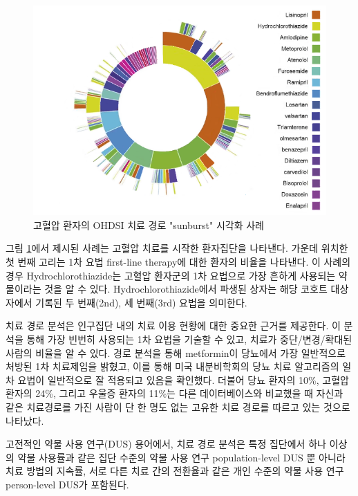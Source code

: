 \documentclass[10.5pt]{book}
\theoremstyle{definition}
\theoremstyle{definition}
\theoremstyle{definition}
\theoremstyle{remark}
\begin{document}
\begin{figure}

{\centering \includegraphics[width=1\linewidth]{images/Characterization/pnasTreatmentPathwaysSunburst} 

}

\caption{고혈압 환자의 OHDSI 치료 경로 "sunburst" 시각화 사례}\label{fig:treatmentPathwaysSunburstDataViz}
\end{figure}

그림 \ref{fig:treatmentPathwaysSunburstDataViz}에서 제시된 사례는 고혈압
치료를 시작한 환자집단을 나타낸다. 가운데 위치한 첫 번째 고리는 1차 요법
first-line therapy에 대한 환자의 비율을 나타낸다. 이 사례의 경우
Hydrochlorothiazide는 고혈압 환자군의 1차 요법으로 가장 흔하게 사용되는
약물이라는 것을 알 수 있다. Hydrochlorothiazide에서 파생된 상자는 해당
코호트 대상자에서 기록된 두 번째(2nd), 세 번째(3rd) 요법을 의미한다.

치료 경로 분석은 인구집단 내의 치료 이용 현황에 대한 중요한 근거를
제공한다. 이 분석을 통해 가장 빈번히 사용되는 1차 요법을 기술할 수 있고,
치료가 중단/변경/확대된 사람의 비율을 알 수 있다. 경로 분석을 통해
metformin이 당뇨에서 가장 일반적으로 처방된 1차 치료제임을 밝혔고, 이를
통해 미국 내분비학회의 당뇨 치료 알고리즘의 일차 요법이 일반적으로 잘
적용되고 있음을 확인했다. 더불어 당뇨 환자의 10\%, 고혈압 환자의 24\%,
그리고 우울증 환자의 11\%는 다른 데이터베이스와 비교했을 때 자신과 같은
치료경로를 가진 사람이 단 한 명도 없는 고유한 치료 경로를 따르고 있는
것으로 나타났다.

고전적인 약물 사용 연구(DUS) 용어에서, 치료 경로 분석은 특정 집단에서
하나 이상의 약물 사용률과 같은 집단 수준의 약물 사용 연구
population-level DUS 뿐 아니라 치료 방법의 지속률, 서로 다른 치료 간의
전환율과 같은 개인 수준의 약물 사용 연구 person-level DUS가 포함된다.
\end{document}
